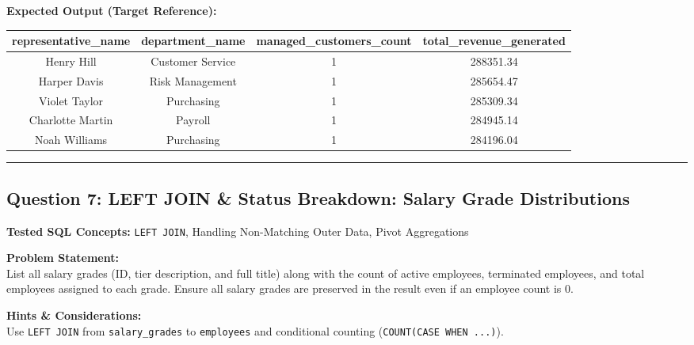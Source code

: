 \documentclass[11pt,a4paper]{article}
\begin{document}
\vspace{0.3cm}
\noindent\textbf{Expected Output (Target Reference):}
\begin{center}
\small
\begin{tabular}{cccc}
\toprule
\textbf{representative\_name} & \textbf{department\_name} & \textbf{managed\_customers\_count} & \textbf{total\_revenue\_generated} \\
\midrule
Henry Hill & Customer Service & 1 & 288351.34 \\
Harper Davis & Risk Management & 1 & 285654.47 \\
Violet Taylor & Purchasing & 1 & 285309.34 \\
Charlotte Martin & Payroll & 1 & 284945.14 \\
Noah Williams & Purchasing & 1 & 284196.04 \\
\bottomrule
\end{tabular}
\end{center}

\vspace{0.4cm}
\noindent\rule{\textwidth}{0.4pt}
\vspace{0.4cm}

\subsection*{Question 7: LEFT JOIN & Status Breakdown: Salary Grade Distributions}

\noindent\textbf{Tested SQL Concepts:} \texttt{LEFT JOIN}, Handling Non-Matching Outer Data, Pivot Aggregations

\vspace{0.15cm}
\noindent\textbf{Problem Statement:} \\
List all salary grades (ID, tier description, and full title) along with the count of active employees, terminated employees, and total employees assigned to each grade. Ensure all salary grades are preserved in the result even if an employee count is 0.

\vspace{0.2cm}
\noindent\textbf{Hints \& Considerations:} \\
Use \texttt{LEFT JOIN} from \texttt{salary\_grades} to \texttt{employees} and conditional counting (\texttt{COUNT(CASE WHEN ...)}).
\end{document}
